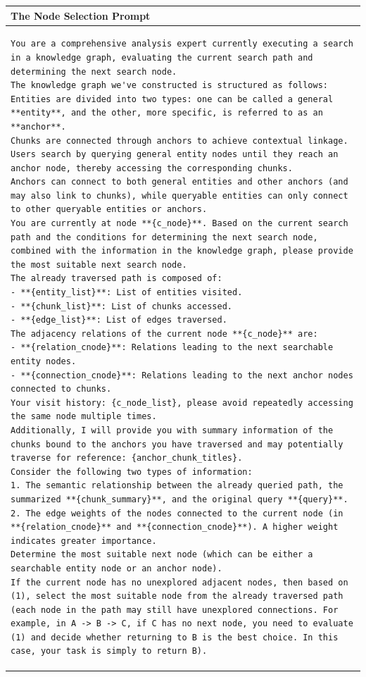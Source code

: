 \begin{table}[h]
\centering
\begin{tabular}{p{\textwidth}}
\toprule
\textbf{The Node Selection Prompt} \\ 
\midrule
\begin{lstlisting}[basicstyle=\ttfamily\small, frame=single, breaklines=true, breakindent=0pt]
You are a comprehensive analysis expert currently executing a search in a knowledge graph, evaluating the current search path and determining the next search node.  
The knowledge graph we've constructed is structured as follows:  
Entities are divided into two types: one can be called a general **entity**, and the other, more specific, is referred to as an **anchor**.  
Chunks are connected through anchors to achieve contextual linkage. Users search by querying general entity nodes until they reach an anchor node, thereby accessing the corresponding chunks.  
Anchors can connect to both general entities and other anchors (and may also link to chunks), while queryable entities can only connect to other queryable entities or anchors.  
You are currently at node **{c_node}**. Based on the current search path and the conditions for determining the next search node, combined with the information in the knowledge graph, please provide the most suitable next search node.  
The already traversed path is composed of:  
- **{entity_list}**: List of entities visited.  
- **{chunk_list}**: List of chunks accessed.  
- **{edge_list}**: List of edges traversed.  
The adjacency relations of the current node **{c_node}** are:  
- **{relation_cnode}**: Relations leading to the next searchable entity nodes.  
- **{connection_cnode}**: Relations leading to the next anchor nodes connected to chunks.  
Your visit history: {c_node_list}, please avoid repeatedly accessing the same node multiple times.
Additionally, I will provide you with summary information of the chunks bound to the anchors you have traversed and may potentially traverse for reference: {anchor_chunk_titles}.
Consider the following two types of information:  
1. The semantic relationship between the already queried path, the summarized **{chunk_summary}**, and the original query **{query}**.  
2. The edge weights of the nodes connected to the current node (in **{relation_cnode}** and **{connection_cnode}**). A higher weight indicates greater importance.  
Determine the most suitable next node (which can be either a searchable entity node or an anchor node).  
If the current node has no unexplored adjacent nodes, then based on (1), select the most suitable node from the already traversed path (each node in the path may still have unexplored connections. For example, in A -> B -> C, if C has no next node, you need to evaluate (1) and decide whether returning to B is the best choice. In this case, your task is simply to return B). 

\end{lstlisting}
\end{tabular}
\end{table}
